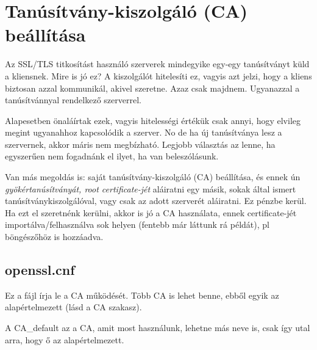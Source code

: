\section{Tanúsítvány-kiszolgáló (CA) beállítása}

Az SSL/TLS titkosítást használó szerverek mindegyike egy-egy tanúsítványt küld a kliensnek. Mire is jó ez? A
kiszolgálót hitelesíti ez, vagyis azt jelzi, hogy a kliens biztosan azzal kommunikál, akivel szeretne. Azaz csak
majdnem. Ugyanazzal a tanúsítvánnyal rendelkező szerverrel.

Alapesetben önaláírtak ezek, vagyis hitelességi értékük csak annyi, hogy elvileg megint ugyanahhoz kapcsolódik a
szerver. No de ha új tanúsítványa lesz a szervernek, akkor máris nem megbízható. Legjobb választás az lenne, ha
egyszerűen nem fogadnánk el ilyet, ha van beleszólásunk.

Van más megoldás is: saját tanúsítvány-kiszolgáló (CA) beállítása, és ennek ún {\em gyökértanúsítványát, root
  certificate-jét} aláiratni egy másik, sokak által ismert tanúsítványkiszolgálóval, vagy csak az adott szerverét
aláiratni. Ez pénzbe kerül. Ha ezt el szeretnénk kerülni, akkor is jó a CA használata, ennek certificate-jét
importálva/felhasználva sok helyen (fentebb már láttunk rá példát), pl böngészőhöz is hozzáadva.

\subsection{openssl.cnf}
Ez a fájl írja le a CA működését. Több CA is lehet benne, ebből egyik az alapértelmezett (lásd a CA szakasz).

A CA\_default az a CA, amit most használunk, lehetne más neve is, csak így utal arra, hogy ő az alapértelmezett.


